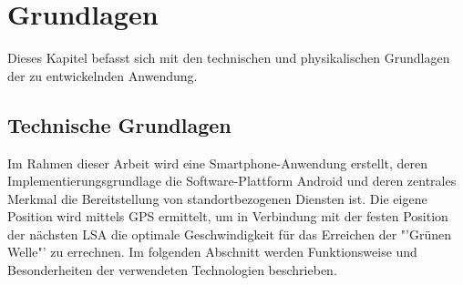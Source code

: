 \chapter{\label{chap:grundlagen}Grundlagen}
Dieses Kapitel befasst sich mit den technischen und physikalischen Grundlagen der zu entwickelnden Anwendung.  
\section{\label{sec:technGrundlagen}Technische Grundlagen}
Im Rahmen dieser Arbeit wird eine \gls{Smartphone}-Anwendung erstellt, deren Implementierungsgrundlage die Software-Plattform Android und deren zentrales Merkmal die Bereitstellung von standortbezogenen Diensten ist. Die eigene Position wird mittels \gls{GPS} ermittelt, um in Verbindung mit der festen Position der nächsten \gls{LSA} die optimale Geschwindigkeit für das Erreichen der "'Grünen Welle"' zu errechnen. Im folgenden Abschnitt werden Funktionsweise und Besonderheiten der verwendeten Technologien beschrieben. 
